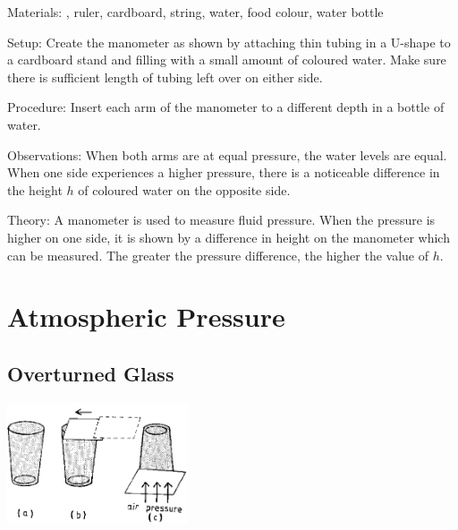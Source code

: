 \begin{multicols}{2}
\begin{description*}
\item[Materials:]{, ruler, cardboard, string, water, food colour, water bottle}
\item[Setup:]{Create the manometer as shown by attaching thin tubing in a U-shape to a cardboard stand and filling with a small amount of coloured water. Make sure there is sufficient length of tubing left over on either side.}
\item[Procedure:]{Insert each arm of the manometer to a different depth in a bottle of water.}
\item[Observations:]{When both arms are at equal pressure, the water levels are equal. When one side experiences a higher pressure, there is a noticeable difference in the height $h$ of coloured water on the opposite side.}
\item[Theory:]{A manometer is used to measure fluid pressure. When the pressure is higher on one side, it is shown by a difference in height on the manometer which can be measured. The greater the pressure difference, the higher the value of $h$.}
\end{description*}


\section*{Atmospheric Pressure}
\label{sec:atm-pressure}


\subsection{Overturned Glass}

\begin{center}
\includegraphics[width=0.4\textwidth]{./img/source/overturned-glass.png}
\end{center}


\end{multicols}

